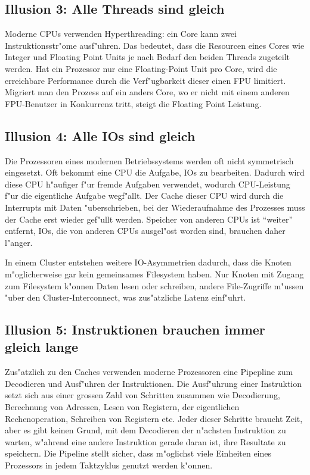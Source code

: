 \subsection{Illusion 3: Alle Threads sind gleich}
Moderne CPUs verwenden Hyperthreading: ein Core kann zwei Instruktionsstr"ome
ausf"uhren.
Das bedeutet, dass die Resourcen eines Cores wie Integer und
Floating Point Units je nach Bedarf den beiden Threads zugeteilt werden.
Hat ein Prozessor nur eine Floating-Point Unit pro Core, wird die
erreichbare Performance durch die Verf"ugbarkeit dieser einen FPU
limitiert.
Migriert man den Prozess auf ein anders Core, wo er nicht mit einem anderen
FPU-Benutzer in Konkurrenz tritt, steigt die Floating Point Leistung.

\subsection{Illusion 4: Alle IOs sind gleich}
Die Prozessoren eines modernen Betriebssystems werden oft nicht symmetrisch
eingesetzt.
Oft bekommt eine CPU die Aufgabe, IOs zu bearbeiten.
Dadurch wird diese CPU h"aufiger f"ur fremde Aufgaben verwendet, wodurch
CPU-Leistung f"ur die eigentliche Aufgabe wegf"allt.
Der Cache dieser CPU wird durch die Interrupts mit Daten "uberschrieben,
bei der Wiederaufnahme des Prozesses muss der Cache erst wieder
gef"ullt werden.
Speicher von anderen CPUs ist ``weiter'' entfernt, IOs, die von anderen
CPUs ausgel"ost worden sind, brauchen daher l"anger.

In einem Cluster entstehen weitere IO-Asymmetrien dadurch, dass
die Knoten m"oglicherweise gar kein gemeinsames Filesystem haben.
Nur Knoten mit Zugang zum Filesystem k"onnen Daten lesen oder schreiben,
andere File-Zugriffe m"ussen "uber den Cluster-Interconnect, was
zus"atzliche Latenz einf"uhrt.

\subsection{Illusion 5: Instruktionen brauchen immer gleich lange}
Zus"atzlich zu den Caches verwenden moderne Prozessoren eine Pipepline
zum Decodieren und Ausf"uhren der Instruktionen.
Die Ausf"uhrung einer Instruktion setzt sich aus einer grossen Zahl
von Schritten zusammen wie Decodierung, Berechnung von Adressen,
Lesen von Registern, der eigentlichen Rechenoperation, Schreiben
von Registern etc.
Jeder dieser Schritte braucht Zeit, aber es gibt keinen Grund, mit
dem Decodieren der n"achsten Instruktion zu warten, w"ahrend eine
andere Instruktion gerade daran ist, ihre Resultate zu speichern.
Die Pipeline stellt sicher, dass m"oglichst viele Einheiten eines
Prozessors in jedem Taktzyklus genutzt werden k"onnen.

